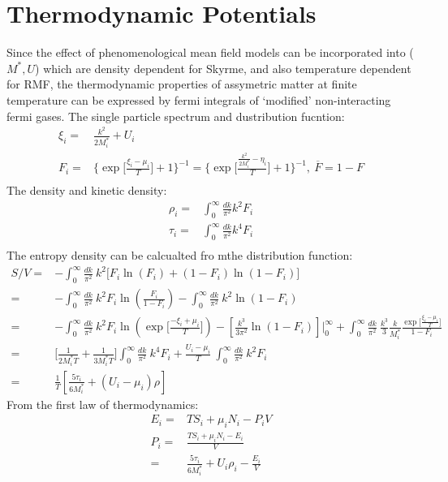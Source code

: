 \documentclass[preprint,prc,preprintnumbers,superscriptaddress,amsmath,amssymb,floatfix]{revtex4-1}
\begin{document}
\section{Thermodynamic Potentials}
Since the effect of phenomenological mean field models can be incorporated into ($M^{*},U$) which are density dependent for Skyrme, and also
temperature dependent for RMF, the thermodynamic properties of assymetric matter at finite temperature can be expressed by fermi integrals of
`modified' non-interacting fermi gases.
The single particle spectrum and dustribution fucntion:
\begin{equation}
 \begin{split}
 \xi_i =& \frac{k^2}{2 M_i^{*}}+U_i\\
  F_i=& \Big\{ \exp \big[\frac{\xi_i-\mu_i}{T} \big] + 1\Big \}^{-1}= \Big\{ \exp \big[\frac{\frac{k^2}{2 M^{*}_i}-\eta_i}{T} \big] + 1\Big \}^{-1},\ \overline{F}=1 -F\\
  \end{split}
  \end{equation}
  The density and kinetic density:
  \begin{equation}
   \begin{split}
  \rho_i=&\int_0^{\infty} \frac{dk}{\pi^2}k^2 F_i\\
  \tau_i=&\int_0^{\infty} \frac{dk}{\pi^2}k^4 F_i\\
   \end{split}
  \end{equation}
  The entropy density can be calcualted fro mthe distribution function:
  \begin{equation}
   \begin{split}
  S/V=&-\int_0^{\infty}\frac{dk}{\pi^2}\ k^2 \big [ F_i\ln(F_i) + (1-F_i)\ln (1-F_i)\big]\\
  =&-\int_0^{\infty}\frac{dk}{\pi^2}\ k^2 F_i \ln(\frac{F_i}{1-F_i})-\int_0^{\infty}\frac{dk}{\pi^2}\ k^2 \ln (1-F_i)\\
  =&-\int_0^{\infty}\frac{dk}{\pi^2}\ k^2 F_i \ln(\exp \big[\frac{-\xi_i+\mu_i}{T} \big])-[\frac{k^3}{3 \pi^2}\ln (1-F_i)]
  \Big|_0^{\infty}+\int_0^{\infty}\frac{dk}{\pi^2}\ \frac{k^3}{3} \frac{k}{M_i^{*}}\frac{\exp \big[\frac{\xi_i-\mu_i}{T} \big]}{1-F_i}\\ 
  =&\big[\frac{1}{2 M_i^{*} T}+\frac{1}{3 M_i^{*}T}\big]\int_0^{\infty}\frac{dk}{\pi^2}\ k^4 F_i+\frac{U_i-\mu_i}{T}\ \int_0^{\infty}\frac{dk}{\pi^2}\ k^2 F_i\\
  =&\frac{1}{T}[\frac{5\tau_i}{6M_i^{*}}+(U_i-\mu_i)\rho]
   \end{split}
  \end{equation}
From the first law of thermodynamics:
  \begin{equation}
  \begin{split}
  E_i =& TS_i+\mu_i N_i-P_iV\\
  P_i=&\frac{T S_i + \mu_i N_i - E_i}{V}\\
    =&\frac{5 \tau_i}{6 M_i^{*}}+U_i \rho_i-\frac{E_i}{V}
  \end{split}
  \end{equation}
\end{document}
